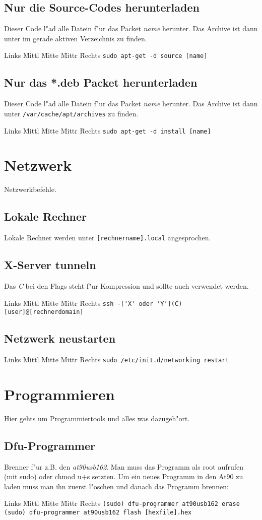 \documentclass[12pt]{article}
\newenvironment{code}{\begin{tabbing}Links \= Mittl \= Mitte \= Mittr \= Rechts \kill}{\end{tabbing}}
\begin{document}
\subsection{Nur die Source-Codes herunterladen}
Dieser Code l"ad alle Datein f"ur das Packet \textit{name} herunter. Das Archive ist dann unter 
im gerade aktiven Verzeichnis zu finden.
\begin{code}
	\> \verb#sudo apt-get -d source [name]#
\end{code}

\subsection{Nur das *.deb Packet herunterladen}
Dieser Code l"ad alle Datein f"ur das Packet \textit{name} herunter. Das Archive ist dann unter 
\verb#/var/cache/apt/archives# zu finden.
\begin{code}
	\> \verb#sudo apt-get -d install [name]#
\end{code}

\section{Netzwerk}
Netzwerkbefehle.
\subsection{Lokale Rechner}
Lokale Rechner werden unter \verb#[rechnername].local# angesprochen.
\subsection{X-Server tunneln}
Das \textit{C} bei den Flags steht f"ur Kompression und sollte auch verwendet werden.
\begin{code}
	\> \verb#ssh -['X' oder 'Y'](C) [user]@[rechnerdomain]#
\end{code}
\subsection{Netzwerk neustarten}
\begin{code}
	\> \verb#sudo /etc/init.d/networking restart#
\end{code}

\section{Programmieren}
Hier gehts um Programmiertools und alles was dazugeh"ort.
\subsection{Dfu-Programmer}
Brenner f"ur z.B. den \textit{at90usb162}. Man muss das Programm als root aufrufen (mit sudo) oder
chmod u+s setzten.
Um ein neues Programm in den At90 zu laden muss man ihn zuerst l"oschen und danach das Programm brennen:
\begin{code}
	\> \verb#(sudo) dfu-programmer at90usb162 erase# \\
	\> \verb#(sudo) dfu-programmer at90usb162 flash [hexfile].hex#	
\end{code}
\end{document}

